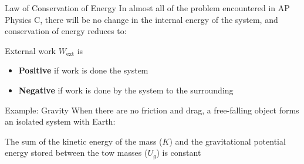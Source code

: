 \documentclass[12pt,compress,aspectratio=169]{beamer}
\begin{document}
\begin{frame}{Law of Conservation of Energy}
  In almost all of the problem encountered in AP Physics C, there will be no
  change in the internal energy of the system, and conservation of energy
  reduces to:
  

  External work $W_\text{ext}$ is
  \begin{itemize}
  \item\textbf{Positive} if work is done  the system
  \item\textbf{Negative} if work is done  by the system to the
    surrounding
  \end{itemize}
\end{frame}





\begin{frame}{Example: Gravity}
  When there are no friction and drag, a free-falling object forms an isolated
  system with Earth:
  \begin{center}
  \end{center}
  The sum of the kinetic energy of the mass ($K$) and the gravitational
  potential energy stored between the tow masses ($U_g$) is constant
    
\end{frame}
\end{document}
